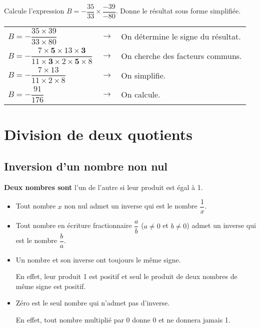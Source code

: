 \begin{exemple*1}
Calcule l'expression $B=-\dfrac{35}{33} \times \dfrac{-39}{-80}$. Donne le résultat sous forme simplifiée.
\correction
\vspace{.5em}
 
\begin{tabular}{lll}
$B = -\dfrac{35 \times 39}{33 \times 80}$ & $\longrightarrow$ & On détermine le signe du résultat. \\
$B = -\dfrac{7 \times \mathbf{5} \times 13 \times \mathbf{3}}{11 \times \mathbf{3} \times 2 \times \mathbf{5} \times 8}$ & $\longrightarrow$ & On cherche des facteurs communs. \\
$B = -\dfrac{7 \times 13}{11 \times 2 \times 8}$ & $\longrightarrow$ & On simplifie. \\
$B = -\dfrac{91}{176}$ & $\longrightarrow$ & On calcule. \\
\end{tabular}
\end{exemple*1}

\section{Division de deux quotients}

\subsection{Inversion d'un nombre non nul}

\begin{definition}
\textbf{Deux nombres sont } l'un de l'autre si leur produit est égal à 1.
\end{definition}

\begin{propriete}
\begin{itemize}
    \item Tout nombre $x$ non nul admet un inverse qui est le nombre $\dfrac{1}{x}$.
    \item Tout nombre en écriture fractionnaire $\dfrac{a}{b}$ ($a\neq 0$ et $b \neq 0$) admet un inverse qui est le nombre $\dfrac{b}{a}$.
\end{itemize}
\end{propriete}

\begin{remarque}
\begin{itemize}
    \item Un nombre et son inverse ont toujours le même signe.
    
    En effet, leur produit 1 est positif et seul le produit de deux nombres de même signe est positif.
    \item Zéro est le seul nombre qui n'admet pas d'inverse.
    
    En effet, tout nombre multiplié par 0 donne 0 et ne donnera jamais 1.
\end{itemize}
\end{remarque}

